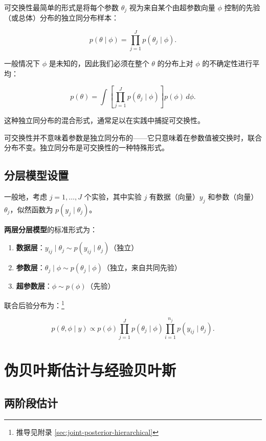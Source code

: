 可交换性最简单的形式是将每个参数 $\theta_j$ 视为来自某个由超参数向量 $\phi$ 控制的先验（或总体）分布的独立同分布样本：

\[
p(\theta \mid \phi) = \prod_{j=1}^{J} p(\theta_j \mid \phi). \label{eq:exchangeable-theta}
\]

一般情况下 $\phi$ 是未知的，因此我们必须在整个 $\theta$ 的分布上对 $\phi$ 的不确定性进行平均：

\[
p(\theta) = \int \left[ \prod_{j=1}^{J} p(\theta_j \mid \phi) \right] p(\phi) \, d\phi. \label{eq:marginal-theta}
\]

这种独立同分布的混合形式，通常足以在实践中捕捉可交换性。

\begin{Remark}
  可交换性并不意味着参数是独立同分布的——它只意味着在参数值被交换时，联合分布不变。独立同分布是可交换性的一种特殊形式。
\end{Remark}

\subsection{分层模型设置}

一般地，考虑 $j = 1, \ldots, J$ 个实验，其中实验 $j$ 有数据（向量）$y_j$ 和参数（向量）$\theta_j$，似然函数为 $p(y_j \mid \theta_j)$。

\textbf{两层分层模型}的标准形式为：

\begin{enumerate}
  \item \textbf{数据层}：$y_{ij} \mid \theta_j \sim p(y_{ij} \mid \theta_j)$（独立）
  \item \textbf{参数层}：$\theta_j \mid \phi \sim p(\theta_j \mid \phi)$（独立，来自共同先验）
  \item \textbf{超参数层}：$\phi \sim p(\phi)$（先验）
\end{enumerate}

联合后验分布为：\footnote{推导见附录 \cref{sec:joint-posterior-hierarchical}}

\[
p(\theta, \phi \mid y) \propto p(\phi) \prod_{j=1}^{J} p(\theta_j \mid \phi) \prod_{i=1}^{n_j} p(y_{ij} \mid \theta_j). \label{eq:joint-posterior-hierarchical}
\]

\section{伪贝叶斯估计与经验贝叶斯}

\subsection{两阶段估计}


